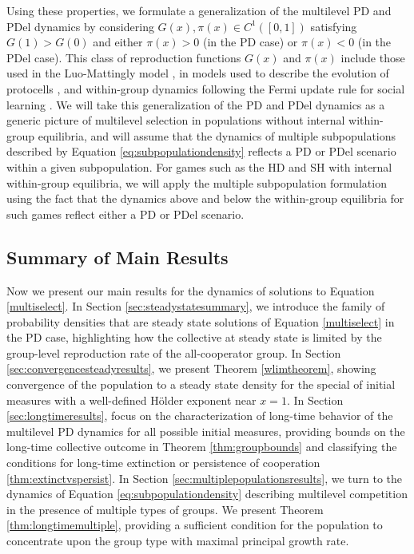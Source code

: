 \documentclass[11pt]{article}
\numberwithin{equation}{section}
\begin{document}
{Using these properties, we formulate a generalization of the multilevel PD and PDel dynamics by considering $G(x), \pi(x) \in C^1\left(\left[0,1\right]\right)$ satisfying $G(1) > G(0)$ and either $\pi(x) > 0$ (in the PD case) or $\pi(x) < 0$ (in the PDel case). This class of reproduction functions $G(x)$ and $\pi(x)$ include those used in the Luo-Mattingly model \cite{luo2014unifying}, in models used to describe the evolution of protocells \cite{cooney2021pde}, and within-group dynamics following the Fermi update rule for social learning \cite{traulsen2005stochastic}. We will take this generalization of the PD and PDel dynamics as a generic picture of multilevel selection in populations without internal within-group equilibria, and will assume that the dynamics of multiple subpopulations described by Equation \eqref{eq:subpopulationdensity} reflects a PD or PDel scenario within a given subpopulation. For games such as the HD and SH with internal within-group equilibria, we will apply the multiple subpopulation formulation using the fact that the dynamics above and below the within-group equilibria for such games reflect either a PD or PDel scenario.  



\subsection{Summary of Main Results}
\label{sec:summary}

Now we present our main results for the dynamics of solutions to Equation \eqref{multiselect}. In Section \ref{sec:steadystatesummary}, we introduce the family of probability densities that are steady state solutions of Equation \eqref{multiselect} in the PD case, highlighting how the collective at steady state is limited by the group-level reproduction rate of the all-cooperator group. In Section \ref{sec:convergencesteadyresults}, we present Theorem \ref{wlimtheorem}, showing convergence of the population to a steady state density for the special of initial measures with a well-defined H{\"o}lder exponent near $x=1$. In Section \ref{sec:longtimeresults}, focus on the characterization of long-time behavior of the multilevel PD dynamics for all possible initial measures, providing bounds on the long-time collective outcome in Theorem \ref{thm:groupbounds} and classifying the conditions for long-time extinction or persistence of cooperation \ref{thm:extinctvspersist}. In Section \ref{sec:multiplepopulationsresults}, we turn to the dynamics of Equation \eqref{eq:subpopulationdensity} describing multilevel competition in the presence of multiple types of groups. We present Theorem \ref{thm:longtimemultiple}, providing a sufficient condition for the population to concentrate upon the group type with maximal principal growth rate. 

}
\end{document}

